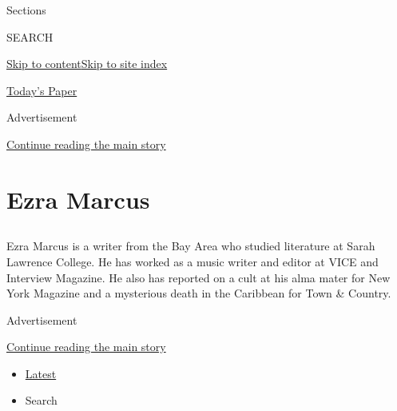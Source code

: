 Sections

SEARCH

\protect\hyperlink{site-content}{Skip to
content}\protect\hyperlink{site-index}{Skip to site index}

\href{https://myaccount.nytimes.com/auth/login?response_type=cookie\&client_id=vi}{}

\href{https://www.nytimes.com/section/todayspaper}{Today's Paper}

Advertisement

\protect\hyperlink{after-top}{Continue reading the main story}

\hypertarget{ezra-marcus}{%
\section{Ezra Marcus}\label{ezra-marcus}}

\subsection{}

Ezra Marcus is a writer from the Bay Area who studied literature at
Sarah Lawrence College. He has worked as a music writer and editor at
VICE and Interview Magazine. He also has reported on a cult at his alma
mater for New York Magazine and a mysterious death in the Caribbean for
Town \& Country.

Advertisement

\protect\hyperlink{after-mid1}{Continue reading the main story}

\begin{itemize}
\tightlist
\item
  \protect\hyperlink{stream-panel}{Latest}
\item
  Search
\end{itemize}

